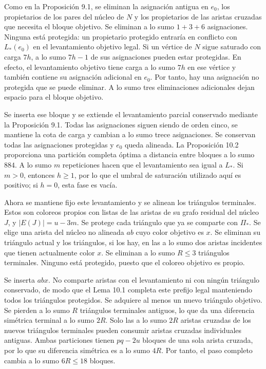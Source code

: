 \documentclass[spanish,11pt,a4paper]{article}
\begin{document}
Como en la Proposición 9.1, se eliminan la asignación antigua en
\(e_0\), los propietarios de los pares del núcleo de \(N\) y los
propietarios de las aristas cruzadas que necesita el bloque objetivo. Se
eliminan a lo sumo \(1+3+6\) asignaciones. Ninguna está protegida: un
propietario protegido entraría en conflicto con \(L_*(e_0)\) en el
levantamiento objetivo legal. Si un vértice de \(N\) sigue saturado con
carga \(7h\), a lo sumo \(7h-1\) de sus asignaciones pueden estar
protegidas. En efecto, el levantamiento objetivo tiene carga a lo sumo
\(7h\) en ese vértice y también contiene su asignación adicional en
\(e_0\). Por tanto, hay una asignación no protegida que se puede
eliminar. A lo sumo tres eliminaciones adicionales dejan espacio para el
bloque objetivo.

Se inserta ese bloque y se extiende el levantamiento parcial conservado
mediante la Proposición 9.1. Todas las asignaciones siguen siendo de
orden cinco, se mantiene la cota de carga y cambian a lo sumo trece
asignaciones. Se conservan todas las asignaciones protegidas y \(e_0\)
queda alineada. La Proposición 10.2 proporciona una partición completa
óptima a distancia entre bloques a lo sumo \(884\). A lo sumo \(m\)
repeticiones hacen que el levantamiento sea igual a \(L_*\). Si \(m>0\),
entonces \(h\ge1\), por lo que el umbral de saturación utilizado aquí es
positivo; si \(h=0\), esta fase es vacía.

Ahora se mantiene fijo este levantamiento y se alinean los triángulos
terminales. Estos son coloreos propios con listas de las aristas de su
grafo residual del núcleo \(J\), y \(|E(J)|=u-3m\). Se protege cada
triángulo que ya se comparte con \(\Pi_*\). Se elige una arista del
núcleo no alineada \(ab\) cuyo color objetivo es \(x\). Se eliminan su
triángulo actual y los triángulos, si los hay, en las a lo sumo dos
aristas incidentes que tienen actualmente color \(x\). Se eliminan a lo
sumo \(R\le3\) triángulos terminales. Ninguno está protegido, puesto que
el coloreo objetivo es propio.

Se inserta \(abx\). No comparte aristas con el levantamiento ni con
ningún triángulo conservado, de modo que el Lema 10.1 completa este
prefijo legal manteniendo todos los triángulos protegidos. Se adquiere
al menos un nuevo triángulo objetivo. Se pierden a lo sumo \(R\)
triángulos terminales antiguos, lo que da una diferencia simétrica
terminal a lo sumo \(2R\). Solo las a lo sumo \(2R\) aristas cruzadas de
los nuevos triángulos terminales pueden consumir aristas cruzadas
individuales antiguas. Ambas particiones tienen \(pq-2u\) bloques de una
sola arista cruzada, por lo que su diferencia simétrica es a lo sumo
\(4R\). Por tanto, el paso completo cambia a lo sumo \(6R\le18\)
bloques.
\end{document}
